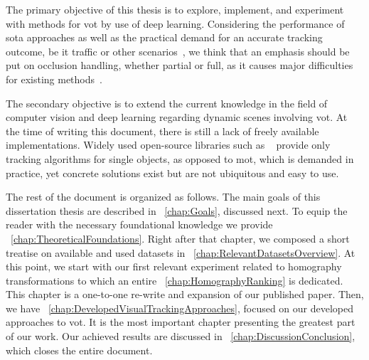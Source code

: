 The primary objective of this thesis is to explore, implement, and experiment with methods for \gls{vot} by use of deep learning. Considering the performance of \gls{sota} approaches as well as the practical demand for an accurate tracking outcome, be it traffic or other scenarios~\cite{tang2019cityflow}, we think that an emphasis should be put on occlusion handling, whether partial or full, as it causes major difficulties for existing methods~\cite{jiyan2007robustocclusion}.

The secondary objective is to extend the current knowledge in the field of computer vision and deep learning regarding dynamic scenes involving \gls{vot}. At the time of writing this document, there is still a lack of freely available implementations. Widely used open-source libraries such as \opencv{}~\cite{bradski2000opencv} provide only tracking algorithms for single objects, as opposed to \gls{mot}, which is demanded in practice, yet concrete solutions exist but are not ubiquitous and easy to use.

The rest of the document is organized as follows. The main goals of this dissertation thesis are described in \chaptertext{}~\ref{chap:Goals}, discussed next. To equip the reader with the necessary foundational knowledge we provide \chaptertext{}~\ref{chap:TheoreticalFoundations}. Right after that chapter, we composed a short treatise on available and used datasets in \chaptertext{}~\ref{chap:RelevantDatasetsOverview}. At this point, we start with our first relevant experiment related to homography transformations to which an entire \chaptertext{}~\ref{chap:HomographyRanking} is dedicated. This chapter is a one-to-one re-write and expansion of our published paper. Then, we have \chaptertext{}~\ref{chap:DevelopedVisualTrackingApproaches}, focused on our developed approaches to \gls{vot}. It is the most important chapter presenting the greatest part of our work. Our achieved results are discussed in \chaptertext{}~\ref{chap:DiscussionConclusion}, which closes the entire document.